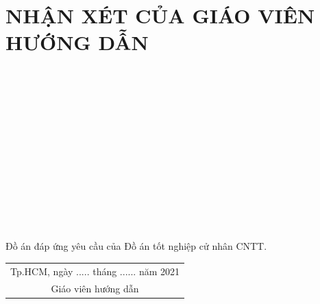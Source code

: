 \chapter*{NHẬN XÉT CỦA GIÁO VIÊN HƯỚNG DẪN}
\label{nhanxetgiaovienhuongdan}
\begin{center}
{
	\dotfill\\[0.5cm]	\dotfill\\[0.5cm]	\dotfill\\[0.5cm]	\dotfill\\[0.5cm]
	\dotfill\\[0.5cm]	\dotfill\\[0.5cm]	\dotfill\\[0.5cm]	\dotfill\\[0.5cm]	\dotfill\\[0.5cm]	\dotfill\\[0.5cm]	\dotfill\\[0.5cm]	\dotfill\\[0.5cm]
}
\end{center}

	Đồ án đáp ứng yêu cầu của Đồ án tốt nghiệp cử nhân CNTT.

\begin{flushright}
	\begin{tabular}{@{}c@{}}
	Tp.HCM, ngày ..... tháng ...... năm 2021\\
	Giáo viên hướng dẫn
	\end{tabular}
\end{flushright}